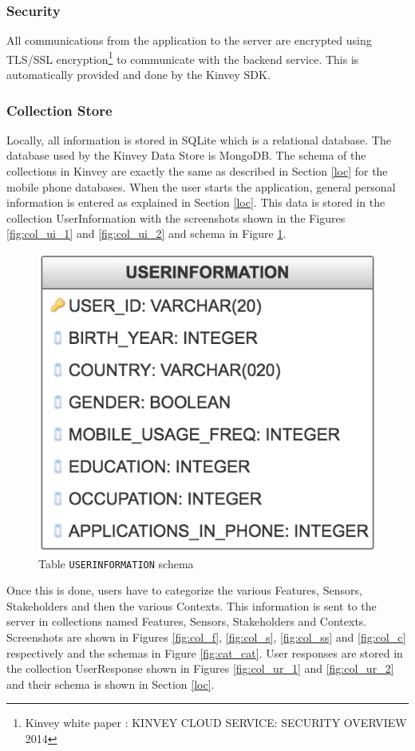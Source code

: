 \subsubsection{Security}

All communications from the application to the server are encrypted using TLS/SSL encryption\footnote{Kinvey white paper : KINVEY CLOUD
SERVICE: SECURITY
OVERVIEW 2014} to communicate with the backend service. This is automatically provided and done by the Kinvey SDK.

\subsubsection{Collection Store}

Locally, all information is stored in SQLite which is a relational database. The database used by the Kinvey Data Store is MongoDB. The schema of the collections in Kinvey are exactly the same as described in Section \ref{loc} for the mobile phone databases.
When the user starts the application, general personal information is entered as explained in Section \ref{loc}. This data is stored in the
collection UserInformation with the screenshots shown in the Figures \ref{fig:col_ui_1} and \ref{fig:col_ui_2} and schema in Figure \ref{fig:cat_cat_cat}.

\begin{figure}[ht!]
\centering
\includegraphics[width=0.4\linewidth]{./images/schema_ui}
\caption{Table \texttt{USERINFORMATION} schema}
\label{fig:cat_cat_cat}
\end{figure}

Once this is done, users have to categorize the various Features, Sensors, Stakeholders and then the various Contexts. This information is sent to the server in collections named Features, Sensors, Stakeholders and Contexts. Screenshots are shown in Figures \ref{fig:col_f}, \ref{fig:col_s}, \ref{fig:col_ss} and \ref{fig:col_c} respectively and the schemas in Figure \ref{fig:cat_cat}. User responses are stored in the collection UserResponse shown in Figures \ref{fig:col_ur_1} and \ref{fig:col_ur_2} and their schema is shown in Section \ref{loc}.

